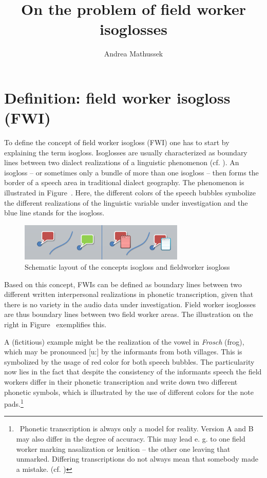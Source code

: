\documentclass[output=paper]{LSP/langsci}
\author{Andrea Mathussek\affiliation{University of Freiburg}}
\title{On the problem of field worker isoglosses}
\begin{document}
% 
% 

\section{Definition: field worker isogloss (FWI)}
To define the concept of {\textquotedbl}field worker isogloss{\textquotedbl} (FWI) one has to start by explaining the term {\textquotedbl}isogloss{\textquotedbl}. Isoglosses are usually characterized as boundary lines between two dialect realizations of a linguistic phenomenon (cf. \citealt[296--297]{gluck_metzler_2005}). An isogloss – or sometimes only a bundle of more than one isogloss – then forms the border of a speech area in traditional dialect geography. The phenomenon is illustrated in Figure~. Here, the different colors of the speech bubbles symbolize the different realizations of the linguistic variable under investigation and the blue line stands for the isogloss.

\begin{figure}
\includegraphics[width=0.7\textwidth]{illustrations/mathus_fig1}
\caption{Schematic layout of the concepts {\textquotedbl}isogloss{\textquotedbl} and {\textquotedbl}fieldworker isogloss{\textquotedbl}}
\label{fig:1}
\end{figure}

Based on this concept, FWIs can be defined as boundary lines between two different written interpersonal realizations in phonetic transcription, given that there is no variety in the audio data under investigation. Field worker isoglosses are thus boundary lines between two field worker areas. The illustration on the right in Figure~ exemplifies this.

A (fictitious) example might be the realization of the vowel in \textit{Frosch} ({\textquotesingle}frog{\textquotesingle}), which may be pronounced [u:] by the informants from both villages. This is symbolized by the usage of red color for both speech bubbles. The particularity now lies in the fact that despite the consistency of the informants{\textquotesingle} speech the field workers differ in their phonetic transcription and write down two different phonetic symbols, which is illustrated by the use of different colors for the note pads.\footnote{\ Phonetic transcription is always only a model for reality. Version A and B may also differ in the degree of accuracy. This may lead e. g. to one field worker marking nasalization or lenition – the other one leaving that unmarked. Differing transcriptions do not always mean that somebody made a mistake. (cf. \citealt[41--69]{mathussek_sprachraume_2014})}
\end{document}
